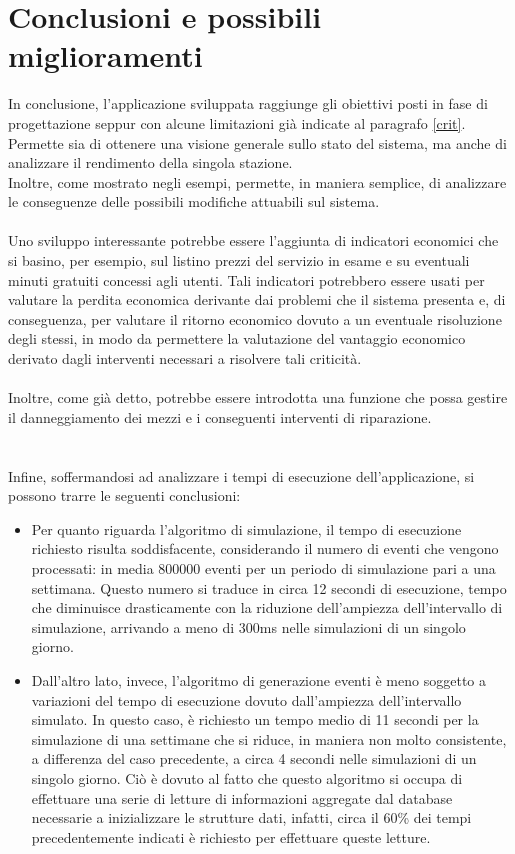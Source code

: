 \documentclass[a4paper, 12pt]{article}
\begin{document}
\newpage


\section{Conclusioni e possibili miglioramenti}

In conclusione, l'applicazione sviluppata raggiunge gli obiettivi posti in fase di progettazione seppur con alcune limitazioni già indicate al paragrafo \ref{crit}.\\
Permette sia di ottenere una visione generale sullo stato del sistema, ma anche di analizzare il rendimento della singola stazione.\\
Inoltre, come mostrato negli esempi, permette, in maniera semplice, di analizzare le conseguenze delle possibili modifiche attuabili sul sistema.\\\\
Uno sviluppo interessante potrebbe essere l'aggiunta di indicatori economici che si basino, per esempio, sul listino prezzi del servizio in esame e su eventuali minuti gratuiti concessi agli utenti. Tali indicatori potrebbero essere usati per valutare la perdita economica derivante dai problemi che il sistema presenta e, di conseguenza, per valutare il ritorno economico dovuto a un eventuale risoluzione degli stessi, in modo da permettere la valutazione del vantaggio economico derivato dagli interventi necessari a risolvere tali criticità.\\\\
Inoltre, come già detto, potrebbe essere introdotta una funzione che possa gestire il danneggiamento dei mezzi e i conseguenti interventi di riparazione.\\\\\\
Infine, soffermandosi ad analizzare i tempi di esecuzione dell'applicazione, si possono trarre le seguenti conclusioni:\\
	\begin{itemize}
	\item Per quanto riguarda l'algoritmo di simulazione, il tempo di esecuzione richiesto risulta soddisfacente, considerando il numero di eventi che vengono processati: in media 800000 eventi per un periodo di simulazione pari a una settimana. Questo numero si traduce in circa 12 secondi di esecuzione, tempo che diminuisce drasticamente con la riduzione dell'ampiezza dell'intervallo di simulazione, arrivando a meno di 300ms nelle simulazioni di un singolo giorno.
	\item Dall'altro lato, invece, l'algoritmo di generazione eventi è meno soggetto a variazioni del tempo di esecuzione dovuto dall'ampiezza dell'intervallo simulato. In questo caso, è richiesto un tempo medio di 11 secondi per la simulazione di una settimane che si riduce, in maniera non molto consistente, a differenza del caso precedente, a circa 4 secondi nelle simulazioni di un singolo giorno. Ciò è dovuto al fatto che questo algoritmo si occupa di effettuare una serie di letture di informazioni aggregate dal database necessarie a inizializzare le strutture dati, infatti, circa il 60\% dei tempi precedentemente indicati è richiesto per effettuare queste letture.
	\end{itemize}
\end{document}
